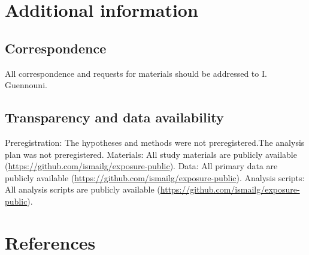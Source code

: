 \documentclass[
]{article}
\begin{document}
\section*{Additional information}\label{additional-information}

\subsection*{Correspondence}\label{correspondence}

All correspondence and requests for materials should be addressed to I.
Guennouni.

\subsection*{Transparency and data availability}\label{transparency-and-data-availability}

Preregistration: The hypotheses and methods were not preregistered.The
analysis plan was not preregistered. Materials: All study materials are
publicly available (\url{https://github.com/ismailg/exposure-public}). Data:
All primary data are publicly available
(\url{https://github.com/ismailg/exposure-public}). Analysis scripts: All
analysis scripts are publicly available
(\url{https://github.com/ismailg/exposure-public}).

\section*{References}\label{references}
\end{document}
